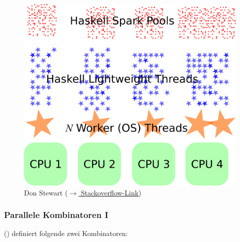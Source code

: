 \documentclass[presentation, shownotes]{beamer}
\begin{document}
\begin{frame}[plain]{}
\begin{figure}
\centering
\includegraphics[height=.8\textheight]{sparks}
    \caption{Don Stewart (\href{https://stackoverflow.com/questions/958449/what-is-a-spark-in-haskell}{$\rightarrow$ Stackoverflow-Link})}
\end{figure}
\end{frame}

\begin{frame}
\frametitle{Parallele Kombinatoren I}
    \citeauthor{trinder1998algorithm} (\citeyear{trinder1998algorithm}) definiert folgende zwei Kombinatoren:
    \begin{itemize}
    \setlength\itemsep{1em}
    \end{itemize}
\end{frame}
\end{document}
